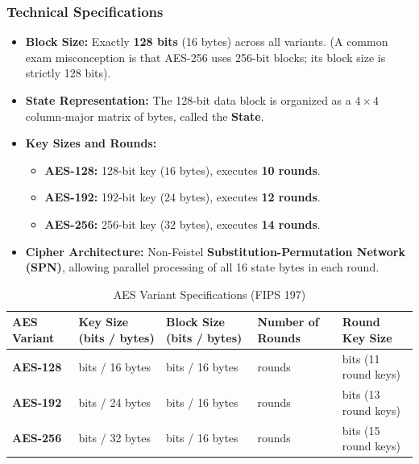 \subsubsection{Technical Specifications}

\begin{itemize}
\item \textbf{Block Size:} Exactly \textbf{128 bits} (16 bytes) across all variants. (A common exam misconception is that AES-256 uses 256-bit blocks; its block size is strictly 128 bits).
\item \textbf{State Representation:} The 128-bit data block is organized as a $4 \times 4$ column-major matrix of bytes, called the \textbf{State}.
\item \textbf{Key Sizes and Rounds:}
\begin{itemize}
\item \textbf{AES-128:} 128-bit key ($16$ bytes), executes \textbf{10 rounds}.
\item \textbf{AES-192:} 192-bit key ($24$ bytes), executes \textbf{12 rounds}.
\item \textbf{AES-256:} 256-bit key ($32$ bytes), executes \textbf{14 rounds}.
\end{itemize}
\item \textbf{Cipher Architecture:} Non-Feistel \textbf{Substitution-Permutation Network (SPN)}, allowing parallel processing of all 16 state bytes in each round.
\end{itemize}

\begin{table}[htbp]
\centering
\caption{AES Variant Specifications (FIPS 197)}
\label{tab:aes_specs}
\begin{tabularx}{\textwidth}{l >{\centering\arraybackslash}X >{\centering\arraybackslash}X >{\centering\arraybackslash}X >{\centering\arraybackslash}X}
\toprule
\textbf{AES Variant} & \textbf{Key Size (bits / bytes)} & \textbf{Block Size (bits / bytes)} & \textbf{Number of Rounds} & \textbf{Round Key Size} \\
\midrule
\textbf{AES-128} & 128 bits / 16 bytes & 128 bits / 16 bytes & 10 rounds & 128 bits (11 round keys) \\
\textbf{AES-192} & 192 bits / 24 bytes & 128 bits / 16 bytes & 12 rounds & 128 bits (13 round keys) \\
\textbf{AES-256} & 256 bits / 32 bytes & 128 bits / 16 bytes & 14 rounds & 128 bits (15 round keys) \\
\bottomrule
\end{tabularx}
\end{table}

